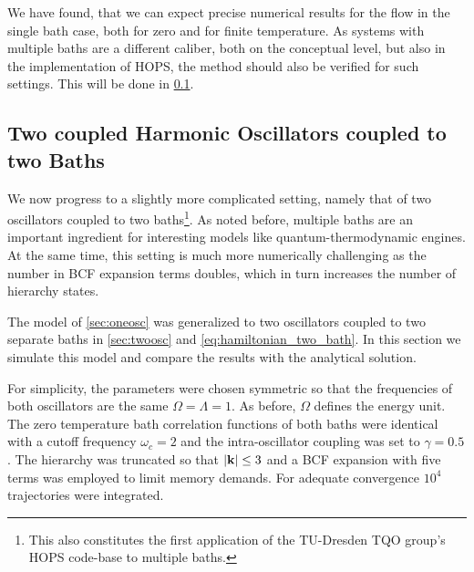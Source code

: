 We have found, that we can expect precise numerical results for the
flow in the single bath case, both for zero and for finite
temperature. As systems with multiple baths are a different caliber,
both on the conceptual level, but also in the implementation of HOPS,
the method should also be verified for such settings. This will be
done in \cref{sec:twoosccomp}.


\subsection{Two coupled Harmonic Oscillators coupled to two Baths}
\label{sec:twoosccomp}
We now progress to a slightly more complicated setting, namely that of
two oscillators coupled to two baths\footnote{This also constitutes
  the first application of the TU-Dresden TQO group's HOPS code-base
  to multiple baths.}. As noted before, multiple baths are an
important ingredient for interesting models like quantum-thermodynamic
engines. At the same time, this setting is much more numerically
challenging as the number in BCF expansion terms doubles, which in
turn increases the number of hierarchy states.

The model of \cref{sec:oneosc} was generalized to two oscillators
coupled to two separate baths in \cref{sec:twoosc} and
\cref{eq:hamiltonian_two_bath}. In this section we simulate this model
and compare the results with the analytical solution.

For simplicity, the parameters were chosen symmetric so that the
frequencies of both oscillators are the same \(Ω=Λ=1\). As before,
\(Ω\) defines the energy unit. The zero temperature bath correlation
functions of both baths were identical with a cutoff frequency
\(ω_c=2\) and the intra-oscillator coupling was set to \(γ=0.5\). The
hierarchy was truncated so that \(\abs{\vb{k}}\leq 3\) and a BCF
expansion with five terms was employed to limit memory demands.  For
adequate convergence \(10^{4}\) trajectories were integrated.

